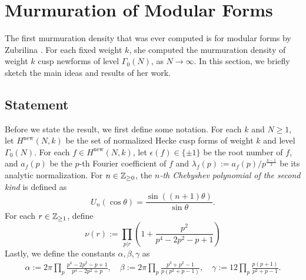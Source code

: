 \section{Murmuration of Modular Forms}
\label{sec:modform}

The first murmuration density that was ever computed is for modular forms by Zubrilina \cite{zubrilina2025murmurations}.
For each fixed weight $k$, she computed the murmuration density of weight $k$ cusp newforms of level $\Gamma_0(N)$, as $N \to \infty$.
In this section, we briefly sketch the main ideas and results of her work.

\subsection{Statement}

Before we state the result, we first define some notation.
For each $k$ and $N \ge 1$, let $H^{\mathrm{new}}(N, k)$ be the set of normalized Hecke cusp forms of weight $k$ and level $\Gamma_0(N)$.
For each $f \in H^{\mathrm{new}}(N, k)$, let $\epsilon(f) \in \{\pm 1\}$ be the root number of $f$, and $a_f(p)$ be the $p$-th Fourier coefficient of $f$ and $\lambda_f(p) := a_f(p) / p^{\frac{k-1}{2}}$ be its analytic normalization.
For $n \in \mathbb{Z}_{\ge 0}$, the \emph{$n$-th Chebyshev polynomial of the second kind} is defined as
\[
    U_n(\cos \theta) = \frac{\sin((n+1) \theta)}{\sin\theta}. 
\]
For each $r \in \mathbb{Z}_{\ge 1}$, define
\[
    \nu(r) := \prod_{p | r} \left(1 + \frac{p^2}{p^4 - 2p^2 - p + 1}\right)
\]
Lastly, we define the constants $\alpha, \beta, \gamma$ as
\begin{align*}
    \alpha := 2\pi \prod_{p} \frac{p^4 - 2p^2 - p + 1}{p^4 - 2p^2 + p}, \quad
    \beta := 2\pi \prod_{p} \frac{p^3 + p^2 - 1}{p(p^2 + p - 1)}, \quad
    \gamma := 12 \prod_{p} \frac{p(p + 1)}{p^2 + p - 1}.
\end{align*}
